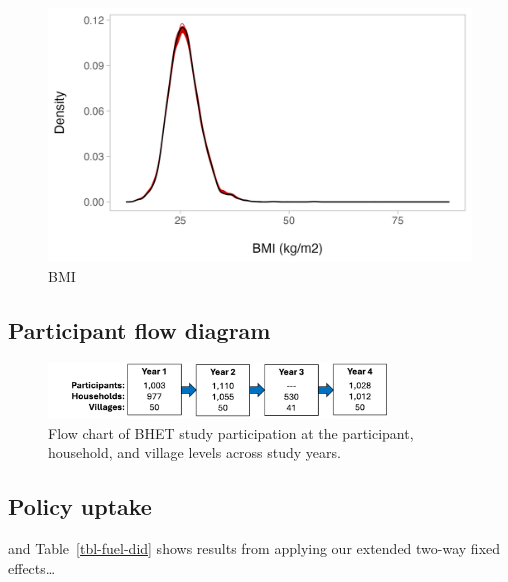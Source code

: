 \documentclass[
  letterpaper,
  DIV=11,
  numbers=noendperiod]{scrartcl}
\begin{document}
\begin{figure}[H]

{\centering \includegraphics{"images/MI_BMI_density.png"}

}

\caption{BMI}

\end{figure}

\hypertarget{participant-flow-diagram}{%
\subsection{Participant flow diagram}\label{participant-flow-diagram}}

\begin{figure}[H]

{\centering \includegraphics[width=0.8\textwidth,height=\textheight]{images/Participation-flowchart-Apr12.png}

}

\caption{\label{fig-flowchart}Flow chart of BHET study participation at
the participant, household, and village levels across study years.}

\end{figure}

\hypertarget{policy-uptake-1}{%
\subsection{Policy uptake}\label{policy-uptake-1}}

and Table~\ref{tbl-fuel-did} shows results from applying our extended
two-way fixed effects\ldots{}
\end{document}
